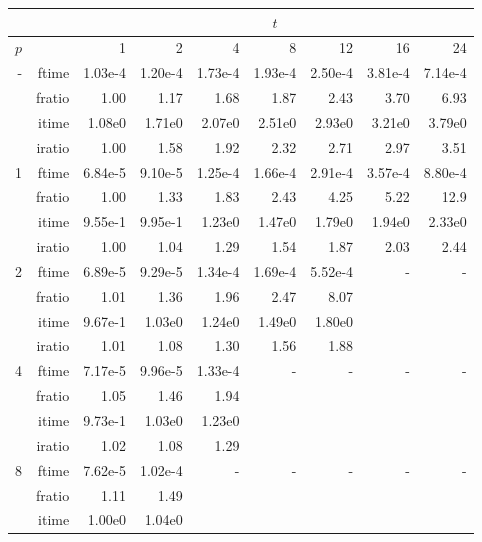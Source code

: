 \documentclass[a4]{article}
\begin{document}
\begin{table}
\begin{center}
\begin{tabular}{|r|r|r|r|r|r|r|r|r|}
\hline 
     &  & \multicolumn{7}{c|}{$t$} \\ \hline
    $p$  &  & 1           & 2    & 4    & 8    & 12   & 16    & 24  \\ \hline\hline
    -  & ftime &  1.03e-4 &   1.20e-4 &   1.73e-4 &   1.93e-4 &   2.50e-4 &   3.81e-4 &   7.14e-4    \\ 
      & fratio &  1.00 &   1.17 &   1.68 &   1.87 &   2.43 &   3.70 &   6.93    \\ 
     & itime &     1.08e0 &   1.71e0 &   2.07e0 &   2.51e0 &   2.93e0 &   3.21e0 &   3.79e0   \\ 
     & iratio &       1.00 &   1.58 &   1.92 &   2.32 &   2.71 &   2.97 &   3.51     \\ \hline \hline
    1  & ftime & 6.84e-5 &  9.10e-5 &  1.25e-4 &  1.66e-4 &  2.91e-4 &  3.57e-4 &  8.80e-4  \\ 
      & fratio & 1.00 &    1.33 &    1.83 &    2.43 &    4.25 &    5.22 &    12.9 \\
     & itime & 9.55e-1 &   9.95e-1 &   1.23e0 &   1.47e0 &   1.79e0 &   1.94e0 &   2.33e0 \\ 
     & iratio & 1.00 &   1.04 &   1.29 &   1.54 &   1.87 &   2.03 &   2.44   \\  \hline
    2  & ftime & 6.89e-5 &  9.29e-5 &  1.34e-4 &  1.69e-4 &  5.52e-4  & - & - \\ 
      & fratio &  1.01 &    1.36 &    1.96 &    2.47 &    8.07     &  &  \\
      & itime &  9.67e-1 &   1.03e0 &   1.24e0 &   1.49e0 &   1.80e0  &  &  \\
      & iratio &  1.01 &   1.08 &   1.30 &   1.56 &   1.88  &  &  \\ \hline
    4  & ftime & 7.17e-5 &  9.96e-5 &  1.33e-4  & - & - & - & - \\ 
      & fratio &  1.05 &    1.46 &    1.94    &  &  &  &  \\
      & itime &  9.73e-1 &   1.03e0 &   1.23e0   &  & & & \\
      & iratio & 1.02 &   1.08 &   1.29   &  & & &  \\ \hline
    8  & ftime &7.62e-5 &  1.02e-4  & - & - & - & - & - \\ 
      & fratio & 1.11 &    1.49    &  &  &  &  &  \\
      & itime &  1.00e0 &   1.04e0  &  & & & & \\

\end{tabular}
\end{center}
\end{table}
\end{document}
